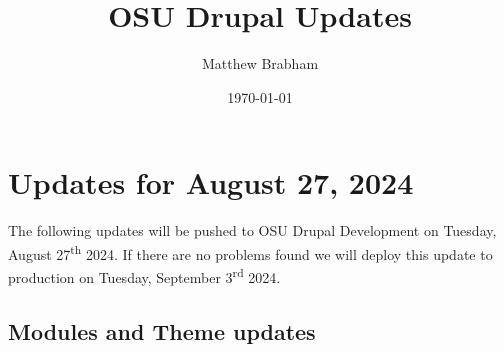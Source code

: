 \documentclass[letterpaper, 12pt, final]{article}
\title{OSU Drupal Updates}
\author{Matthew Brabham}
\date{\today}
\begin{document}
\maketitle
\tableofcontents
\newpage
\section{Updates for August 27, 2024}
The following updates will be pushed to OSU Drupal Development on Tuesday, August 27\textsuperscript{th} 2024.
If there are no problems found we will deploy this update to production on Tuesday, September 3\textsuperscript{rd} 2024.

\subsection{Modules and Theme updates}
\end{document}
